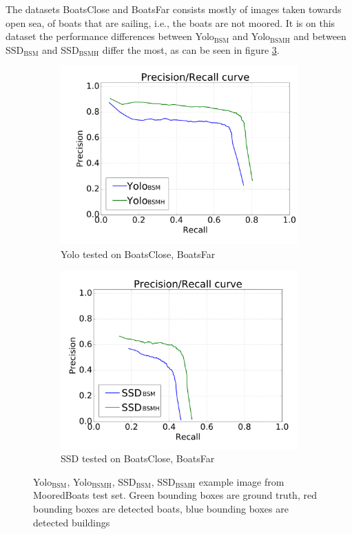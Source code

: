 The datasets BoatsClose and BoatsFar consists mostly of images taken towards open sea, of boats that are sailing, i.e., the boats are not moored. It is on this dataset the performance differences between Yolo$_{\text{BSM}}$ and Yolo$_{\text{BSMH}}$ and between SSD$_{\text{BSM}}$ and SSD$_{\text{BSMH}}$ differ the most, as can be seen in figure \ref{fig:bcbf_prec}.

\begin{figure}[h!]
\begin{subfigure}{.5\textwidth}
  \centering
  \includegraphics[width=0.8\linewidth]{results/case_buildings/prec_recall/yolo/bcbf-eps.png}
  \caption{Yolo tested on BoatsClose, BoatsFar}
  \label{fig:ex_bcbf_prec_rec_yolo}
\end{subfigure}%
\begin{subfigure}{.5\textwidth}
  \centering
  \includegraphics[width=.8\linewidth]{results/case_buildings/prec_recall/ssd/bcbf-eps.png}
  \caption{SSD tested on BoatsClose, BoatsFar}
  \label{fig:ex_bcbf_prec_rec_ssd}
\end{subfigure}
\caption{Yolo$_{\text{BSM}}$, Yolo$_{\text{BSMH}}$, SSD$_{\text{BSM}}$, SSD$_{\text{BSMH}}$ example image from MooredBoats test set. Green bounding boxes are ground truth, red bounding boxes are detected boats, blue bounding boxes are detected buildings}
\label{fig:bcbf_prec}
\end{figure}

